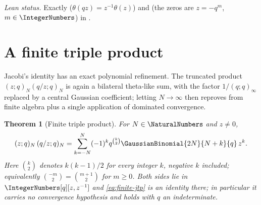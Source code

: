\documentclass[11pt,a4paper,oneside,openany]{book}
\newtheorem{theorem}{Theorem}[chapter]
\theoremstyle{definition}
\theoremstyle{remark}
\begin{document}
\emph{Lean status.}  Exactly 
($\theta(qz)=z^{-1}\theta(z)$) and  (the zeros are
$z=-q^m$, $m\in\IntegerNumbers$) in .



\section{A finite triple product}

Jacobi's identity has an exact polynomial refinement.  The truncated product $(z;q)_N(q/z;q)_N$ is again a bilateral theta-like sum, with the factor $1/(q;q)_\infty$ replaced by a central Gaussian coefficient; letting $N\to\infty$ then reproves  from finite algebra plus a single application of dominated convergence.

\begin{theorem}[Finite triple product]\label{thm:finite-jtp}
For $N\in\NaturalNumbers$ and $z\ne0$,
\begin{equation}
 (z;q)_N\,(q/z;q)_N
 =\sum_{k=-N}^{N}(-1)^k q^{\binom k2}
 \GaussianBinomial{2N}{N+k}{q}\,z^{k}.
 \label{eq:finite-jtp}
\end{equation}
Here $\binom k2$ denotes $k(k-1)/2$ for every integer $k$, negative $k$ included; equivalently $\binom{-m}{2}=\binom{m+1}{2}$ for $m\ge0$.
Both sides lie in $\IntegerNumbers[q][z,z^{-1}]$ and \eqref{eq:finite-jtp} is an identity there; in particular it carries no convergence hypothesis and holds with $q$ an indeterminate.
\end{theorem}
\end{document}
